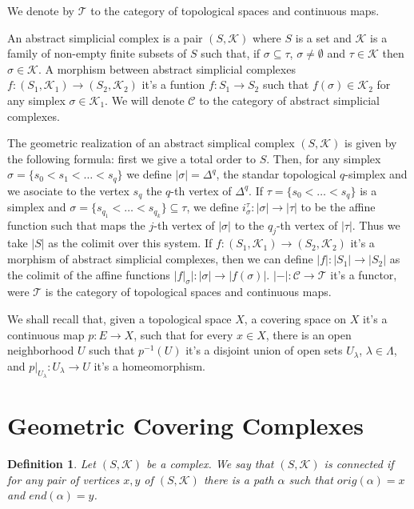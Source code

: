 \documentclass{amsart}
\newtheorem{definition}{Definition}[section]
\begin{document}
We  denote by $\mathcal{T}$ to the category of topological spaces and continuous maps.

An abstract simplicial complex is a pair $(S,\mathcal{K})$ where $S$ is a set and $\mathcal{K}$ is a family of non-empty finite subsets of $S$ such that, if $\sigma\subseteq \tau$, $\sigma\neq\emptyset$ and $\tau\in \mathcal{K}$ then $\sigma\in\mathcal{K}$. A morphism between abstract simplicial complexes $f\colon(S_1,\mathcal{K}_1)\to(S_2,\mathcal{K}_2)$ it's a funtion $f\colon S_{1}\to S_{2}$ such that $f(\sigma)\in\mathcal{K}_{2}$ for any simplex $\sigma\in\mathcal{K}_{1}$. We will denote $\mathcal{C}$ to the category of abstract simplicial complexes.

The geometric realization of an abstract simplical complex $(S,\mathcal{K})$ is given by the following formula: first we give a total order to $S$. Then, for any simplex $\sigma=\{s_{0}<s_{1}<\ldots<s_{q}\}$ we define $|\sigma|=\Delta^{q}$, the standar topological $q$-simplex and we asociate to the vertex $s_{q}$ the $q$-th vertex of $\Delta^{q}$. If $\tau=\{s_{0}<\ldots<s_{q}\}$ is a simplex and $\sigma=\{s_{q_{1}}<\ldots<s_{q_{k}}\}\subseteq\tau$, we define $i_{\sigma}^{\tau}\colon|\sigma|\to|\tau|$ to be the affine function such that maps the $j$-th vertex of $|\sigma|$ to the $q_{j}$-th vertex of $|\tau|$. Thus we take $|S|$ as the colimit over this system. If $f\colon(S_{1},\mathcal{K}_{1})\to(S_{2},\mathcal{K}_{2})$ it's a morphism of abstract simplicial complexes, then we can define $|f|\colon|S_{1}|\to|S_{2}|$ as the colimit of the affine functions $|f|_{\sigma}|\colon|\sigma|\to|f(\sigma)|$. $|-|\colon\mathcal{C}\to\mathcal{T}$ it's a functor, were $\mathcal{T}$ is the category of topological spaces and continuous maps.


We shall recall that, given a topological space $X$, a covering space on $X$ it's a continuous map $p\colon E\to X$, such that for every $x\in X$, there is an open neighborhood $U$ such that $p^{-1}(U)$ it's a disjoint union of open sets $U_{\lambda}$, $\lambda\in\Lambda$, and $p|_{U_{\lambda}}\colon U_{\lambda}\to U$ it's a homeomorphism.

\section{Geometric Covering Complexes}


\begin{definition}
Let $(S,\mathcal{K})$ be a complex. We say that $(S,\mathcal{K})$ is connected if for any pair of vertices $x,y$ of $(S,\mathcal{K})$ there is a path $\alpha$ such that $orig(\alpha)=x$ and $end(\alpha)=y$.
\end{definition}
\end{document}
